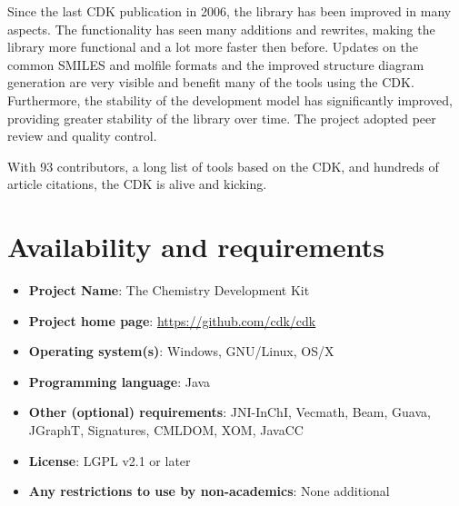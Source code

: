 \documentclass[10pt]{bmcart}
\begin{document}
Since the last CDK publication in 2006, the library has been improved in many
aspects. The functionality has seen many additions and rewrites, making the
library more functional and a lot more faster then before. Updates on the common
SMILES and molfile formats and the improved structure diagram generation are
very visible and benefit many of the tools using the CDK.
Furthermore, the stability of the development model has significantly improved,
providing greater stability of the library over time. The project adopted peer
review and quality control.

With 93 contributors, a long list of tools based on the CDK, and hundreds
of article citations, the CDK is alive and kicking.

\section*{Availability and requirements}

\begin{itemize}
\item \textbf{Project Name}: The Chemistry Development Kit
\item \textbf{Project home page}: \url{https://github.com/cdk/cdk}
\item \textbf{Operating system(s)}: Windows, GNU/Linux, OS/X
\item \textbf{Programming language}: Java
\item \textbf{Other (optional) requirements}: JNI-InChI, Vecmath, Beam, Guava, JGraphT, Signatures, CMLDOM, XOM, JavaCC
\item \textbf{License}: LGPL v2.1 or later
\item \textbf{Any restrictions to use by non-academics}: None additional
\end{itemize}

\end{document}
